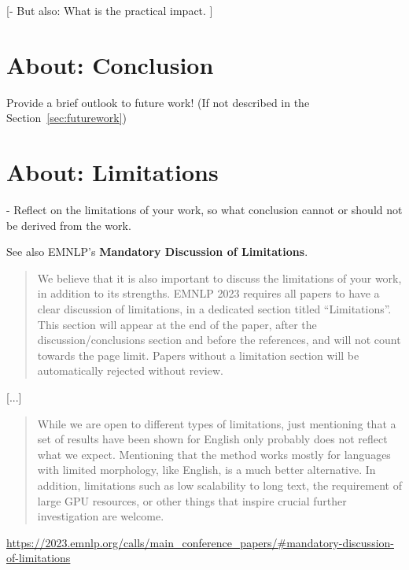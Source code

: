 \documentclass[manuscript, nonacm]{acmart}
\begin{document}
[- But also: What is the practical impact. ]



\section{About: Conclusion}
\label{sec:conclusion}


Provide a brief outlook to future work! (If not described in the Section~\ref{sec:futurework})


\section{About: Limitations}

- Reflect on the limitations of your work, so what conclusion cannot or should not be derived from the work.

See also EMNLP's \textbf{Mandatory Discussion of Limitations}.

\begin{quote}
    We believe that it is also important to discuss the limitations of your work, in addition to its strengths. EMNLP 2023 requires all papers to have a clear discussion of limitations, in a dedicated section titled “Limitations”. This section will appear at the end of the paper, after the discussion/conclusions section and before the references, and will not count towards the page limit. Papers without a limitation section will be automatically rejected without review.
\end{quote}

[...]

\begin{quote}
While we are open to different types of limitations, just mentioning that a set of results have been shown for English only probably does not reflect what we expect. Mentioning that the method works mostly for languages with limited morphology, like English, is a much better alternative. In addition, limitations such as low scalability to long text, the requirement of large GPU resources, or other things that inspire crucial further investigation are welcome.
\end{quote}

\url{https://2023.emnlp.org/calls/main_conference_papers/#mandatory-discussion-of-limitations}
\end{document}
